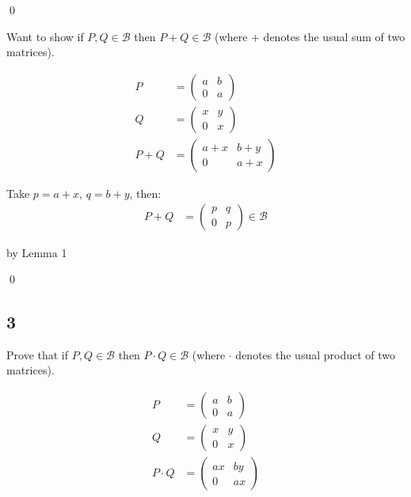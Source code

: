 \documentclass[12pt]{article}
\begin{document}
\qed

Want to show if $P,Q \in \mathcal{B}$ then $P + Q \in \mathcal{B}$ (where $+$ denotes the usual sum of two matrices).

\begin{align*}
P &= \begin{pmatrix}
a & b \\
0 & a
\end{pmatrix} \\
Q &= \begin{pmatrix}
x & y \\
0 & x
\end{pmatrix} \\
P + Q &= \begin{pmatrix}
a + x & b + y \\
0 & a + x
\end{pmatrix}
\end{align*}

Take $p = a + x$, $q = b + y$, then: \\

\begin{align*}
P + Q &= \begin{pmatrix}
p & q \\
0 & p
\end{pmatrix} \in \mathcal{B}
\end{align*}

by Lemma 1

\qed

\subsection*{3}

Prove that if $P,Q \in \mathcal{B}$ then $P \cdot Q \in \mathcal{B}$ (where $\cdot$ denotes the usual product of two matrices).

\begin{align*}
P &= \begin{pmatrix}
a & b \\
0 & a
\end{pmatrix} \\
Q &= \begin{pmatrix}
x & y \\
0 & x
\end{pmatrix} \\
P \cdot Q &= \begin{pmatrix}
a x & b y \\
0 & a x
\end{pmatrix}
\end{align*}
\end{document}
